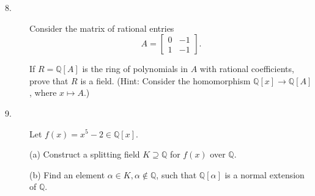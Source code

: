 \documentclass{article}
\def\Q{\mathbb Q}
\begin{document}
\begin{description}
\item[8.]
Consider the matrix of rational entries
$$A= \begin{bmatrix} 0&-1 \\ 1&-1 \end{bmatrix}.$$

If $R=\Q[A]$ is the ring of polynomials in $A$ with rational coefficients,
prove that $R$ is a field. (Hint: Consider the homomorphism $\Q[x] \to \Q[A]$,
where $x \mapsto A$.)

\item[9.]
Let $f(x) = x^5 - 2 \in \Q[x]$.

\item[\quad] (a)
Construct a splitting field $K \supseteq \Q$ for $f(x)$ over $\Q$.

\item[\quad] (b)
Find an element $\alpha \in K, \alpha \notin \Q$, such that
$\Q[\alpha]$ is a normal extension of $\Q$.





\end{description}    
\end{document}
